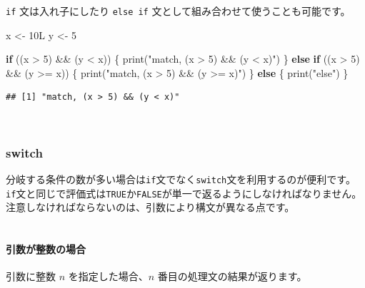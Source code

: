 \documentclass[
  12pt,
]{book}
\newenvironment{Shaded}{\begin{snugshade}}{\end{snugshade}}
\newcommand{\ControlFlowTok}[1]{\textcolor[rgb]{0.13,0.29,0.53}{\textbf{#1}}}
\newcommand{\DecValTok}[1]{\textcolor[rgb]{0.00,0.00,0.81}{#1}}
\newcommand{\FunctionTok}[1]{\textcolor[rgb]{0.00,0.00,0.00}{#1}}
\newcommand{\NormalTok}[1]{#1}
\newcommand{\OtherTok}[1]{\textcolor[rgb]{0.56,0.35,0.01}{#1}}
\newcommand{\SpecialCharTok}[1]{\textcolor[rgb]{0.00,0.00,0.00}{#1}}
\newcommand{\StringTok}[1]{\textcolor[rgb]{0.31,0.60,0.02}{#1}}
\begin{document}
\texttt{if} 文は入れ子にしたり \texttt{else\ if} 文として組み合わせて使うことも可能です。

\begin{Shaded}
\begin{Highlighting}[numbers=left,,]
\NormalTok{x }\OtherTok{\textless{}{-}}\NormalTok{ 10L}
\NormalTok{y }\OtherTok{\textless{}{-}} \DecValTok{5}

\ControlFlowTok{if}\NormalTok{ ((x }\SpecialCharTok{\textgreater{}} \DecValTok{5}\NormalTok{) }\SpecialCharTok{\&\&}\NormalTok{ (y }\SpecialCharTok{\textless{}}\NormalTok{ x)) \{}
   \FunctionTok{print}\NormalTok{(}\StringTok{"match, (x \textgreater{} 5) \&\& (y \textless{} x)"}\NormalTok{)}
\NormalTok{\} }\ControlFlowTok{else} \ControlFlowTok{if}\NormalTok{ ((x }\SpecialCharTok{\textgreater{}} \DecValTok{5}\NormalTok{) }\SpecialCharTok{\&\&}\NormalTok{ (y }\SpecialCharTok{\textgreater{}=}\NormalTok{ x)) \{}
   \FunctionTok{print}\NormalTok{(}\StringTok{"match, (x \textgreater{} 5) \&\& (y \textgreater{}= x)"}\NormalTok{)}
\NormalTok{\} }\ControlFlowTok{else}\NormalTok{ \{}
   \FunctionTok{print}\NormalTok{(}\StringTok{"else"}\NormalTok{)}
\NormalTok{\}}
\end{Highlighting}
\end{Shaded}

\begin{verbatim}
## [1] "match, (x > 5) && (y < x)"
\end{verbatim}

　

\hypertarget{switch}{%
\subsubsection{switch}\label{switch}}

分岐する条件の数が多い場合は\texttt{if}文でなく\texttt{switch}文を利用するのが便利です。\texttt{if}文と同じで評価式は\texttt{TRUE}か\texttt{FALSE}が単一で返るようにしなければなりません。注意しなければならないのは、引数により構文が異なる点です。\\
　

\hypertarget{ux5f15ux6570ux304cux6574ux6570ux306eux5834ux5408}{%
\paragraph{引数が整数の場合}\label{ux5f15ux6570ux304cux6574ux6570ux306eux5834ux5408}}

引数に整数 \(n\) を指定した場合、\(n\) 番目の処理文の結果が返ります。
\end{document}
